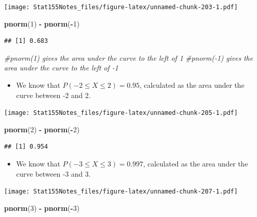 \documentclass[]{book}
\newenvironment{Shaded}{\begin{snugshade}}{\end{snugshade}}
\newcommand{\CommentTok}[1]{\textcolor[rgb]{0.56,0.35,0.01}{\textit{#1}}}
\newcommand{\DecValTok}[1]{\textcolor[rgb]{0.00,0.00,0.81}{#1}}
\newcommand{\KeywordTok}[1]{\textcolor[rgb]{0.13,0.29,0.53}{\textbf{#1}}}
\newcommand{\NormalTok}[1]{#1}
\newcommand{\OperatorTok}[1]{\textcolor[rgb]{0.81,0.36,0.00}{\textbf{#1}}}
\newcommand{\StringTok}[1]{\textcolor[rgb]{0.31,0.60,0.02}{#1}}
\providecommand{\tightlist}{%
  \setlength{\itemsep}{0pt}\setlength{\parskip}{0pt}}
\begin{document}
\texttt{[image: Stat155Notes\_files/figure-latex/unnamed-chunk-203-1.pdf]}

\begin{Shaded}
\begin{Highlighting}[]
\KeywordTok{pnorm}\NormalTok{(}\DecValTok{1}\NormalTok{) }\OperatorTok{-}\StringTok{ }\KeywordTok{pnorm}\NormalTok{(}\OperatorTok{-}\DecValTok{1}\NormalTok{) }
\end{Highlighting}
\end{Shaded}

\begin{verbatim}
## [1] 0.683
\end{verbatim}

\begin{Shaded}
\begin{Highlighting}[]
\CommentTok{#pnorm(1) gives the area under the curve to the left of 1}
\CommentTok{#pnorm(-1) gives the area under the curve to the left of -1}
\end{Highlighting}
\end{Shaded}

\begin{itemize}
\tightlist
\item
  We know that \(P(-2\leq X \leq 2) = 0.95\), calculated as the area under the curve between -2 and 2.
\end{itemize}

\texttt{[image: Stat155Notes\_files/figure-latex/unnamed-chunk-205-1.pdf]}

\begin{Shaded}
\begin{Highlighting}[]
\KeywordTok{pnorm}\NormalTok{(}\DecValTok{2}\NormalTok{) }\OperatorTok{-}\StringTok{ }\KeywordTok{pnorm}\NormalTok{(}\OperatorTok{-}\DecValTok{2}\NormalTok{)}
\end{Highlighting}
\end{Shaded}

\begin{verbatim}
## [1] 0.954
\end{verbatim}

\begin{itemize}
\tightlist
\item
  We know that \(P(-3\leq X \leq 3) = 0.997\), calculated as the area under the curve between -3 and 3.
\end{itemize}

\texttt{[image: Stat155Notes\_files/figure-latex/unnamed-chunk-207-1.pdf]}

\begin{Shaded}
\begin{Highlighting}[]
\KeywordTok{pnorm}\NormalTok{(}\DecValTok{3}\NormalTok{) }\OperatorTok{-}\StringTok{ }\KeywordTok{pnorm}\NormalTok{(}\OperatorTok{-}\DecValTok{3}\NormalTok{)}
\end{Highlighting}
\end{Shaded}
\end{document}
